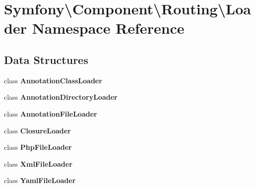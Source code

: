 \section{Symfony\textbackslash{}Component\textbackslash{}Routing\textbackslash{}Loader Namespace Reference}
\label{namespace_symfony_1_1_component_1_1_routing_1_1_loader}
\subsection*{Data Structures}
\begin{DoxyCompactItemize}
\item 
class {\bf Annotation\+Class\+Loader}
\item 
class {\bf Annotation\+Directory\+Loader}
\item 
class {\bf Annotation\+File\+Loader}
\item 
class {\bf Closure\+Loader}
\item 
class {\bf Php\+File\+Loader}
\item 
class {\bf Xml\+File\+Loader}
\item 
class {\bf Yaml\+File\+Loader}
\end{DoxyCompactItemize}
